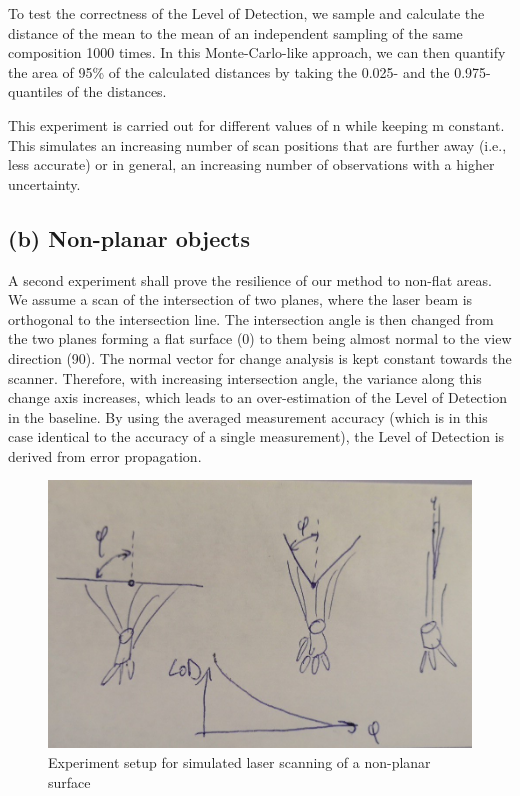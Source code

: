 \documentclass[preprint,12pt,3p]{elsarticle}
\begin{document}
To test the correctness of the Level of Detection, we sample and calculate the distance of the mean to the mean of an independent sampling of the same composition 1000 times. In this Monte-Carlo-like approach, we can then quantify the area of 95\% of the calculated distances by taking the 0.025- and the 0.975-quantiles of the distances.

This experiment is carried out for different values of n while keeping m constant. This simulates an increasing number of scan positions that are further away (i.e., less accurate) or in general, an increasing number of observations with a higher uncertainty.

\subsection{(b) Non-planar objects}
A second experiment shall prove the resilience of our method to non-flat areas. We assume a scan of the intersection of two planes, where the laser beam is orthogonal to the intersection line. The intersection angle is then changed from the two planes forming a flat surface (0\degree) to them being almost normal to the view direction (90\degree). 
The normal vector for change analysis is kept constant towards the scanner. Therefore, with increasing intersection angle, the variance along this change axis increases, which leads to an over-estimation of the Level of Detection in the baseline. By using the averaged measurement accuracy (which is in this case identical to the accuracy of a single measurement), the Level of Detection is derived from error propagation.

\begin{figure}
    \centering
    \includegraphics[width=0.9\linewidth]{figs/experiment2a.png}
    \caption{Experiment setup for simulated laser scanning of a non-planar surface}
    \label{fig:setup_b}
\end{figure}
\end{document}
